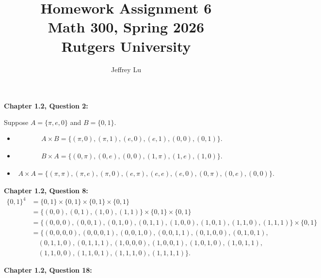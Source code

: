 \documentclass[12pt]{article}
\title{Homework Assignment 6\\ \large Math 300, Spring 2026 \\ Rutgers University}
\author{Jeffrey Lu}
\begin{document}
\maketitle

\noindent \textbf{Chapter 1.2, Question 2:}

Suppose $A = \{ \pi, e, 0\}$ and $B = \{0, 1\}$.
\begin{itemize}
    \item [(a)]
          \begin{align*}
              A \times B = \{ (\pi, 0), (\pi, 1), (e, 0), (e, 1), (0, 0), (0, 1)\}.
          \end{align*}
    \item  [(b)]
          \begin{align*}
              B \times A = \{(0, \pi), (0, e), (0, 0), (1, \pi), (1, e), (1, 0)\}.
          \end{align*}
    \item [(c)]
          \begin{align*}
              A \times A = \{ (\pi, \pi), (\pi, e), (\pi, 0), (e, \pi), (e, e), (e, 0), (0, \pi), (0, e), (0, 0) \}.
          \end{align*}
\end{itemize}

\noindent \textbf{Chapter 1.2, Question 8:}
\begin{align*}
    \{0, 1\}^4 & = \{0, 1\} \times \{0, 1\} \times \{0, 1\} \times \{0, 1\}                                                      \\
               & = \{ (0, 0), (0, 1), (1, 0), (1, 1) \} \times \{0, 1\} \times \{0, 1\}                                          \\
               & = \{ (0, 0, 0), (0, 0, 1), (0, 1, 0), (0, 1 , 1), (1, 0, 0), (1, 0, 1), (1, 1, 0), (1, 1, 1) \} \times \{0, 1\} \\
               & = \{ (0, 0, 0, 0), (0, 0, 0, 1), (0, 0, 1, 0), (0, 0, 1, 1), (0, 1, 0, 0), (0, 1, 0, 1),                        \\
               & \quad (0, 1, 1, 0), (0, 1, 1, 1), (1, 0, 0, 0), (1, 0, 0, 1), (1, 0, 1, 0), (1, 0, 1, 1),                       \\
               & \quad (1, 1, 0, 0), (1, 1, 0, 1), (1, 1, 1, 0), (1, 1, 1, 1) \}.
\end{align*}

\newpage{}
\noindent \textbf{Chapter 1.2, Question 18:}

\end{document}
